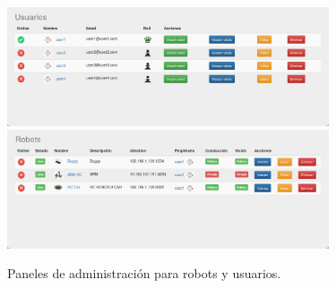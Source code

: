 \begin{figure}[H]
    \centering
    \includegraphics[width=9.5cm]{imagenes/manual-usuario/administracion-usuarios.png}
    \qquad
    \includegraphics[width=9.5cm]{imagenes/manual-usuario/administracion-robots.png}
    \caption{Paneles de administración para robots y usuarios.}%
    \label{fig:http-request}%
\end{figure}
